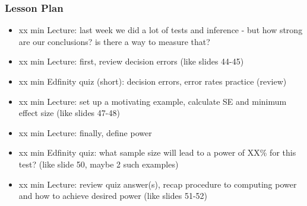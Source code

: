 \begin{frame}
    \frametitle{Lesson Plan}
    \begin{itemize}
        \item xx min Lecture: last week we did a lot of tests and inference - but how strong are our conclusions? is there a way to measure that?
        \item xx min Lecture: first, review decision errors (like slides 44-45)
        \item xx min Edfinity quiz (short): decision errors, error rates practice (review)
        \item xx min Lecture: set up a motivating example, calculate SE and minimum effect size (like slides 47-48)
        \item xx min Lecture: finally, define power
        \item xx min Edfinity quiz: what sample size will lead to a power of XX\% for this test? (like slide 50, maybe 2 such examples) 
        \item xx min Lecture: review quiz answer(s), recap procedure to computing power and how to achieve desired power (like slides 51-52)
    \end{itemize}
\end{frame}

